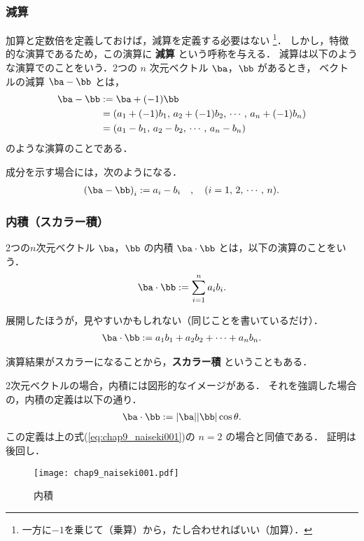        \subsubsection{減算}
        加算と定数倍を定義しておけば，減算を定義する必要はない
            \footnote{
                一方に$-1$を乗じて（乗算）から，たし合わせればいい（加算）．
            }．
        しかし，特徴的な演算であるため，この演算に \textbf{減算} という呼称を与える．
        減算は以下のような演算でのことをいう．2つの $n$ 次元ベクトル $\ba$，$\bb$ があるとき，
        ベクトルの減算 $\ba-\bb$ とは，
        \begin{align*}
            \ba-\bb &:= \ba + (-1)\bb \\
                    &= (a_{1}+(-1)b_{1},\, a_{2}+(-1)b_{2},\,\cdots,\, a_{n}+(-1)b_{n} ) \\
                    &= (a_{1}-b_{1},\, a_{2}-b_{2},\,\cdots,\, a_{n}-b_{n} )
        \end{align*}
        のような演算のことである．

        成分を示す場合には，次のようになる．
        \begin{align}
            {(\ba-\bb)}_{i} := a_{i}-b_{i} \quad,\quad (i=1,\,2,\,\cdots,\,n).
        \end{align}

        \subsubsection{内積（スカラー積）}
        2つの$n$次元ベクトル $\ba$，$\bb$ の内積 $\ba\cdot\bb$ とは，以下の演算のことをいう．
        \begin{align}\label{eq:chap9_naiseki001}
            \ba\cdot\bb := \sum_{i=1}^{n} a_{i}b_{i}.
        \end{align}

        展開したほうが，見やすいかもしれない（同じことを書いているだけ）．
        \begin{align}
            \ba\cdot\bb := a_{1}b_{1} + a_{2}b_{2} + \cdots + a_{n}b_{n}.
        \end{align}

        演算結果がスカラーになることから，\textbf{スカラー積} ということもある．

        2次元ベクトルの場合，内積には図形的なイメージがある．
        それを強調した場合の，内積の定義は以下の通り．
        \begin{align}
            \ba\cdot\bb := |\ba||\bb| \cos \theta.
        \end{align}
        この定義は上の式(\ref{eq:chap9_naiseki001})の $n=2$ の場合と同値である．
        証明は後回し．
        \begin{figure}[htbp]
            \begin{center}
                \texttt{[image: chap9\_naiseki001.pdf]}
                \caption{内積}
                \label{fig:chap9_naiseki001}
            \end{center}
        \end{figure}

